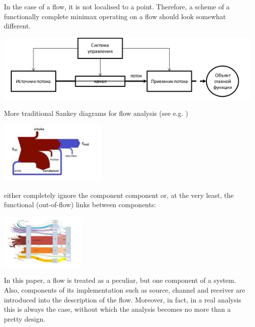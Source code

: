 \documentclass[a4paper,11pt]{article}
\begin{document}
In the case of a flow, it is not localised to a point. Therefore, a scheme of
a functionally complete minimax operating on a flow should look somewhat
different.
\begin{center}
  \includegraphics[width=.8\textwidth]{2.png}
\end{center}
More traditional Sankey diagrams for flow analysis (see e.g. \cite{B12})
\begin{center}
  \includegraphics[width=.8\textwidth]{3.png}
\end{center}
either completely ignore the component component or, at the very least, the
functional (out-of-flow) links between components:
\begin{center}
  \includegraphics[width=.8\textwidth]{4.png}
\end{center}
In this paper, a flow is treated as a peculiar, but one component of a
system. Also, components of its implementation such as source, channel and
receiver are introduced into the description of the flow. Moreover, in fact,
in a real analysis this is always the case, without which the analysis becomes
no more than a pretty design.
\end{document}
